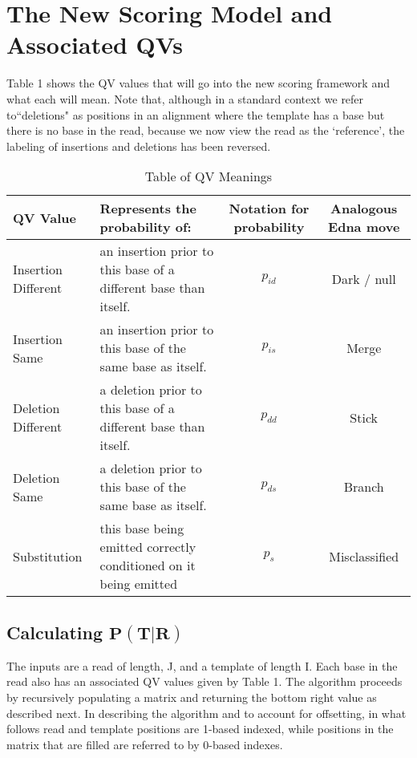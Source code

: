 \documentclass[fleqn,10pt]{SelfArx} %
\begin{document}

\section{The New Scoring Model and Associated QVs}

Table 1 shows the QV values that will go into the new scoring framework and what each will mean.  Note that, although in a standard context we refer to``deletions" as positions in an alignment where the template has a base but there is no base in the read, because we now view the read as the `reference', the labeling of insertions and deletions has been reversed.

\begin{table*}[bt]
\caption{Table of QV Meanings}
\centering
    \begin{tabular}{| l | p{7cm} | c | c |  }
    \toprule
    \hline
    \textbf{QV Value} &  \textbf{Represents the probability of:} &  \textbf{Notation for probability} &  \textbf{Analogous Edna move}  \\ \hline \hline
    Insertion Different & an insertion prior to this base of a different base than itself. & $p_{id}$  & Dark / null \\ \hline
    Insertion Same & an insertion prior to this base of the same base as itself.& $p_{is}$ & Merge \\ \hline
    Deletion Different & a deletion prior to this base of a different base than itself. & $p_{dd}$  & Stick \\ \hline
    Deletion Same & a deletion prior to this base of the same base as itself. & $p_{ds}$  & Branch \\ \hline
    Substitution & this base being emitted correctly conditioned on it being emitted & $p_{s}$  &  Misclassified \\ \hline
    \bottomrule
    \end{tabular}
\end{table*}





\subsection{ Calculating $\mathbf{P(T|R)}$} 

The inputs are a read of length, J, and a template of length I.  Each base in the read also has an associated QV values given by Table 1.   The algorithm proceeds by recursively populating a matrix and returning the bottom right value as described next.  In describing the algorithm and to account for offsetting, in what follows read and template positions are 1-based indexed, while positions in the matrix that are filled are referred to by 0-based indexes. 
\end{document}

